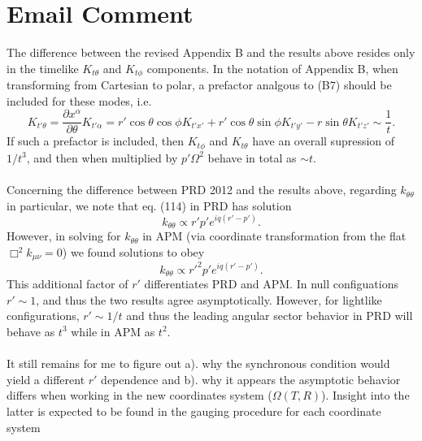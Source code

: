 \documentclass[10pt,letterpaper]{article}
\begin{document}
\section*{Email Comment}
The difference between the revised Appendix B and the results above resides only in the timelike $K_{t\theta}$ and $K_{t\phi}$ components. In the notation of Appendix B, when transforming from Cartesian to polar, a prefactor analgous to (B7) should be included for these modes, i.e.
\begin{equation}
K_{t'\theta} = \frac{\partial x^\alpha}{\partial \theta} K_{t'\alpha} = r'\cos\theta\cos\phi K_{t'x'}+r'\cos\theta\sin\phi K_{t'y'} - r\sin\theta K_{t'z'} \sim \frac{1}{t}.
\end{equation}
If such a prefactor is included, then $K_{t\phi}$ and $K_{t\theta}$ have an overall supression of $1/{t^3}$, and then when multiplied by $p'\Omega^2$ behave in total as $\sim t$. 
\\ \\
Concerning the difference between PRD 2012 and the results above, regarding $k_{\theta\theta}$ in particular,  we note that eq. (114)  in PRD has solution
\begin{equation}
k_{\theta\theta} \propto r'p' e^{iq(r'-p')}.
\end{equation}
However, in solving for $k_{\theta\theta}$ in APM (via coordinate transformation from the flat $\Box^2 k_{\mu\nu}=0$) we found solutions to obey
\begin{equation}
k_{\theta\theta} \propto r'^2 p' e^{iq(r'-p')}. 
\end{equation}
This additional factor of $r'$ differentiates PRD and APM. In null configuations $r'\sim 1$, and thus the two results agree asymptotically. However, for lightlike configurations, $r' \sim 1/t$ and thus the leading angular sector behavior in PRD will behave as $t^3$ while in APM as $t^2$. 
\\ \\
It still remains for me to figure out a). why the synchronous condition would yield a different $r'$ dependence and b). why it appears the asymptotic behavior differs when working in the new coordinates system ($\Omega(T,R)$). Insight into the latter is expected to be found in the gauging procedure for each coordinate system 
\end{document}
